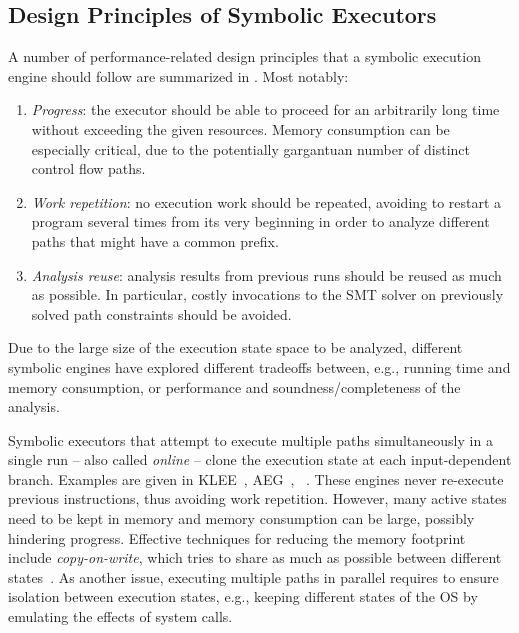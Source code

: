\subsection{Design Principles of Symbolic Executors}
\label{ss:principles}

A number %
of performance-related design principles that a symbolic execution engine should follow are  summarized in %
\cite{MAYHEM-SP12}. Most notably:
\begin{enumerate}
  \item {\em Progress}: the executor should be able to proceed for an arbitrarily long time without exceeding the given resources. Memory consumption can be especially critical, due to the potentially gargantuan number of distinct control flow paths.
  \item {\em Work repetition}: no execution work should be repeated, avoiding to restart a program several times from its very beginning in order to analyze different paths that might have a  common prefix.
  \item {\em Analysis reuse}: analysis results from previous runs should be reused as much as possible. In particular, costly invocations to the SMT solver on  previously solved path constraints should be avoided.
\end{enumerate}

\noindent Due to the large size of the execution state space to be analyzed, different symbolic engines have explored different tradeoffs between, e.g., running time and memory consumption, or performance and soundness/completeness of the analysis.

Symbolic executors that attempt to execute multiple paths simultaneously in a single run -- also called {\em online} -- clone the execution state at each input-dependent branch. Examples are given in {\sc KLEE}~\cite{KLEE-OSDI08}, {\sc AEG}~\cite{AEG-NDSS11}, {\sc \stwoe}~\cite{CKC-TOCS12}. These engines never re-execute previous instructions, thus avoiding work repetition. However, many active states need to be kept in memory and memory consumption can be large, possibly hindering progress. Effective techniques for reducing the memory footprint include {\em copy-on-write}, which tries to share as much as possible between different states~\cite{KLEE-OSDI08}. As another issue, executing multiple paths in parallel requires to ensure isolation between execution states, e.g., keeping different states of the OS by emulating the effects of system calls.

